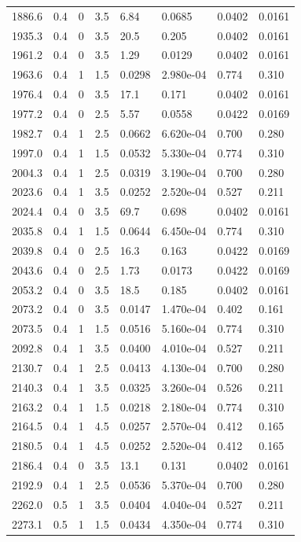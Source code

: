 \documentclass[preview]{standalone}
\begin{document}
{{{\begin{tabular}{L{1.2cm}C{1.2cm} C{0.3cm}C{0.5cm} C{1.4cm}C{1.4cm} C{1.4cm}C{1.4cm}}
  1886.6  &   0.4  & 0     & 3.5 &  6.84  & 0.0685  & 0.0402 &  0.0161   \\ 
  1935.3  &   0.4  & 0     & 3.5 &  20.5  & 0.205  & 0.0402 &  0.0161   \\ 
  1961.2  &   0.4  & 0     & 3.5 &  1.29  & 0.0129  & 0.0402 &  0.0161   \\ 
  1963.6  &   0.4  & 1     & 1.5 &  0.0298  & 2.980e-04  & 0.774 &  0.310   \\ 
  1976.4  &   0.4  & 0     & 3.5 &  17.1  & 0.171  & 0.0402 &  0.0161   \\ 
  1977.2  &   0.4  & 0     & 2.5 &  5.57  & 0.0558  & 0.0422 &  0.0169   \\ 
  1982.7  &   0.4  & 1     & 2.5 &  0.0662  & 6.620e-04  & 0.700 &  0.280   \\ 
  1997.0  &   0.4  & 1     & 1.5 &  0.0532  & 5.330e-04  & 0.774 &  0.310   \\ 
  2004.3  &   0.4  & 1     & 2.5 &  0.0319  & 3.190e-04  & 0.700 &  0.280   \\ 
  2023.6  &   0.4  & 1     & 3.5 &  0.0252  & 2.520e-04  & 0.527 &  0.211   \\ 
  2024.4  &   0.4  & 0     & 3.5 &  69.7  & 0.698  & 0.0402 &  0.0161   \\ 
  2035.8  &   0.4  & 1     & 1.5 &  0.0644  & 6.450e-04  & 0.774 &  0.310   \\ 
  2039.8  &   0.4  & 0     & 2.5 &  16.3  & 0.163  & 0.0422 &  0.0169   \\ 
  2043.6  &   0.4  & 0     & 2.5 &  1.73  & 0.0173  & 0.0422 &  0.0169   \\ 
  2053.2  &   0.4  & 0     & 3.5 &  18.5  & 0.185  & 0.0402 &  0.0161   \\ 
  2073.2  &   0.4  & 0     & 3.5 &  0.0147  & 1.470e-04  & 0.402 &  0.161   \\ 
  2073.5  &   0.4  & 1     & 1.5 &  0.0516  & 5.160e-04  & 0.774 &  0.310   \\ 
  2092.8  &   0.4  & 1     & 3.5 &  0.0400  & 4.010e-04  & 0.527 &  0.211   \\ 
  2130.7  &   0.4  & 1     & 2.5 &  0.0413  & 4.130e-04  & 0.700 &  0.280   \\ 
  2140.3  &   0.4  & 1     & 3.5 &  0.0325  & 3.260e-04  & 0.526 &  0.211   \\ 
  2163.2  &   0.4  & 1     & 1.5 &  0.0218  & 2.180e-04  & 0.774 &  0.310   \\ 
  2164.5  &   0.4  & 1     & 4.5 &  0.0257  & 2.570e-04  & 0.412 &  0.165   \\ 
  2180.5  &   0.4  & 1     & 4.5 &  0.0252  & 2.520e-04  & 0.412 &  0.165   \\ 
  2186.4  &   0.4  & 0     & 3.5 &  13.1  & 0.131  & 0.0402 &  0.0161   \\ 
  2192.9  &   0.4  & 1     & 2.5 &  0.0536  & 5.370e-04  & 0.700 &  0.280   \\ 
  2262.0  &   0.5  & 1     & 3.5 &  0.0404  & 4.040e-04  & 0.527 &  0.211   \\ 
  2273.1  &   0.5  & 1     & 1.5 &  0.0434  & 4.350e-04  & 0.774 &  0.310   \\ 
\hline 
\end{tabular} 

}}}
\end{document}
